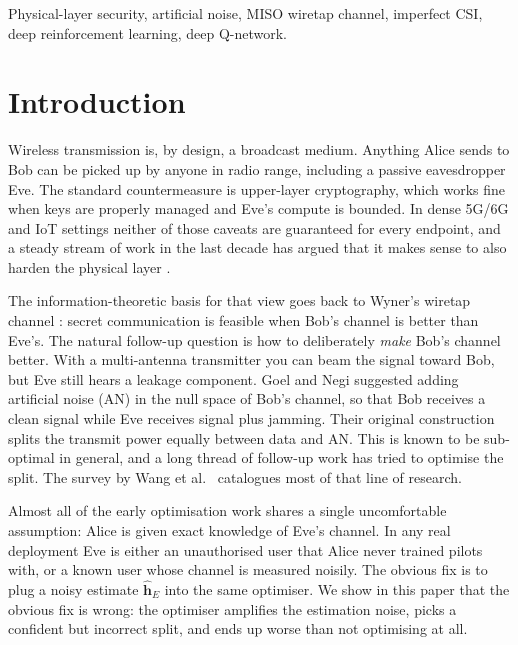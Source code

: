 \documentclass[conference]{IEEEtran}
\begin{document}
\begin{IEEEkeywords}
Physical-layer security, artificial noise, MISO wiretap channel,
imperfect CSI, deep reinforcement learning, deep Q-network.
\end{IEEEkeywords}

\section{Introduction}

Wireless transmission is, by design, a broadcast medium. Anything Alice
sends to Bob can be picked up by anyone in radio range, including a
passive eavesdropper Eve. The standard countermeasure is upper-layer
cryptography, which works fine when keys are properly managed and Eve's
compute is bounded. In dense 5G/6G and IoT settings neither of those
caveats are guaranteed for every endpoint, and a steady stream of work
in the last decade has argued that it makes sense to also harden the
physical layer
\cite{vannithamby2017towards, mukherjee2014survey}.

The information-theoretic basis for that view goes back to Wyner's
wiretap channel \cite{wyner1975wiretap}: secret communication is
feasible when Bob's channel is better than Eve's. The natural follow-up
question is how to deliberately \emph{make} Bob's channel better. With
a multi-antenna transmitter you can beam the signal toward Bob, but
Eve still hears a leakage component. Goel and Negi
\cite{goel2008guaranteeing} suggested adding artificial noise (AN) in
the null space of Bob's channel, so that Bob receives a clean signal
while Eve receives signal plus jamming. Their original construction
splits the transmit power equally between data and AN. This is known to
be sub-optimal in general, and a long thread of follow-up work has
tried to optimise the split. The survey by Wang et al.\
\cite{wang2019survey} catalogues most of that line of research.

Almost all of the early optimisation work shares a single uncomfortable
assumption: Alice is given exact knowledge of Eve's channel. In any
real deployment Eve is either an unauthorised user that Alice never
trained pilots with, or a known user whose channel is measured noisily.
The obvious fix is to plug a noisy estimate $\hat{\mathbf{h}}_E$ into
the same optimiser. We show in this paper that the obvious fix is
wrong: the optimiser amplifies the estimation noise, picks a confident
but incorrect split, and ends up worse than not optimising at all.
\end{document}
